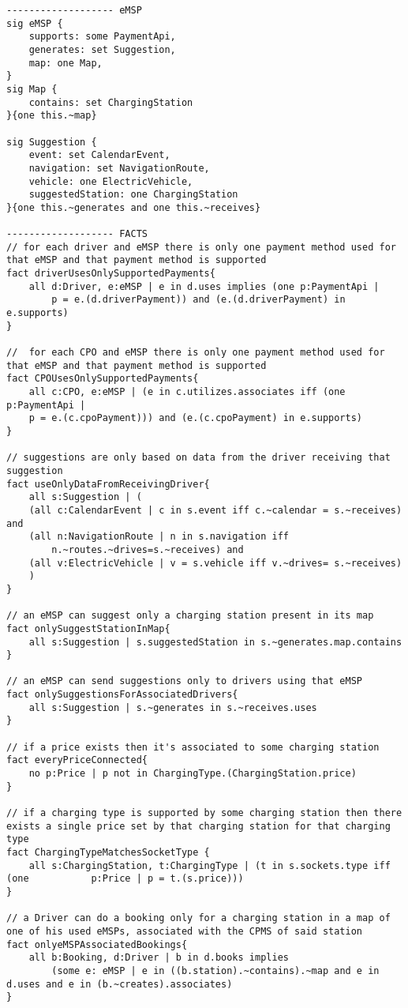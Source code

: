 \begin{lstlisting}[language=alloy]
------------------- eMSP 
sig eMSP {
    supports: some PaymentApi,
    generates: set Suggestion,
    map: one Map,
}
sig Map {
    contains: set ChargingStation
}{one this.~map}

sig Suggestion {
    event: set CalendarEvent,
    navigation: set NavigationRoute,
    vehicle: one ElectricVehicle,
    suggestedStation: one ChargingStation
}{one this.~generates and one this.~receives}

------------------- FACTS
// for each driver and eMSP there is only one payment method used for that eMSP and that payment method is supported
fact driverUsesOnlySupportedPayments{
    all d:Driver, e:eMSP | e in d.uses implies (one p:PaymentApi | 
        p = e.(d.driverPayment)) and (e.(d.driverPayment) in e.supports)
}

//  for each CPO and eMSP there is only one payment method used for that eMSP and that payment method is supported
fact CPOUsesOnlySupportedPayments{	
    all c:CPO, e:eMSP | (e in c.utilizes.associates iff (one p:PaymentApi | 
    p = e.(c.cpoPayment))) and (e.(c.cpoPayment) in e.supports)
}

// suggestions are only based on data from the driver receiving that suggestion
fact useOnlyDataFromReceivingDriver{
    all s:Suggestion | (
	(all c:CalendarEvent | c in s.event iff c.~calendar = s.~receives) and
	(all n:NavigationRoute | n in s.navigation iff
        n.~routes.~drives=s.~receives) and
	(all v:ElectricVehicle | v = s.vehicle iff v.~drives= s.~receives)
	)
}

// an eMSP can suggest only a charging station present in its map
fact onlySuggestStationInMap{
    all s:Suggestion | s.suggestedStation in s.~generates.map.contains
}

// an eMSP can send suggestions only to drivers using that eMSP
fact onlySuggestionsForAssociatedDrivers{
    all s:Suggestion | s.~generates in s.~receives.uses
}

// if a price exists then it's associated to some charging station
fact everyPriceConnected{
    no p:Price | p not in ChargingType.(ChargingStation.price)
}

// if a charging type is supported by some charging station then there exists a single price set by that charging station for that charging type
fact ChargingTypeMatchesSocketType {
    all s:ChargingStation, t:ChargingType | (t in s.sockets.type iff (one           p:Price | p = t.(s.price)))
}

// a Driver can do a booking only for a charging station in a map of one of his used eMSPs, associated with the CPMS of said station
fact onlyeMSPAssociatedBookings{
    all b:Booking, d:Driver | b in d.books implies 
        (some e: eMSP | e in ((b.station).~contains).~map and e in d.uses and e in (b.~creates).associates)
}


\end{lstlisting}
